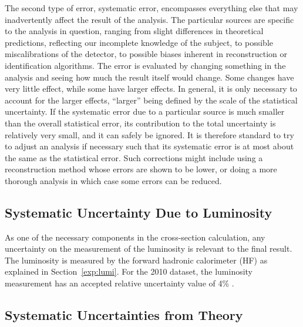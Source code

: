 The second type of error, systematic error, 
encompasses everything else that may 
inadvertently 
affect the result of the analysis.  
The particular sources are specific to the analysis 
in question, 
ranging from slight differences 
in theoretical predictions, 
reflecting our incomplete knowledge of the subject, 
to possible miscalibrations of the detector, 
to possible biases inherent in reconstruction 
or identification algorithms.  
The error is evaluated by changing something 
in the analysis and seeing how much the 
result itself would change.  
Some changes have very little effect, 
while some have larger effects.  
In general, it is only necessary to account 
for the larger effects, 
``larger'' being defined by the scale 
of the statistical uncertainty.  
If the systematic error due to a particular 
source is much smaller than the 
overall statistical error, 
its contribution to the total uncertainty 
is relatively very small, 
and it can safely be ignored.  
It is therefore standard to try to adjust 
an analysis if necessary such that its 
systematic error is at most about the same as 
the statistical error.  
Such corrections might include using 
a reconstruction method whose errors 
are shown to be lower, 
or doing a more thorough analysis 
in which case some errors can be reduced.  




\subsection{Systematic Uncertainty Due to Luminosity}
\label{anMeth:SystsLumi}


As one of the necessary components in the 
cross-section calculation, 
any uncertainty on the measurement of the luminosity 
is relevant to the final result.  
The luminosity is measured by the forward hadronic calorimeter (HF) 
as explained in Section~\ref{exp:lumi}.  
For the 2010 dataset, 
the luminosity measurement has an accepted 
relative uncertainty value of 4\% \cite{LumiPublicResults2010}.  

\subsection{Systematic Uncertainties from Theory}
\label{anMeth:SystsTheory}

